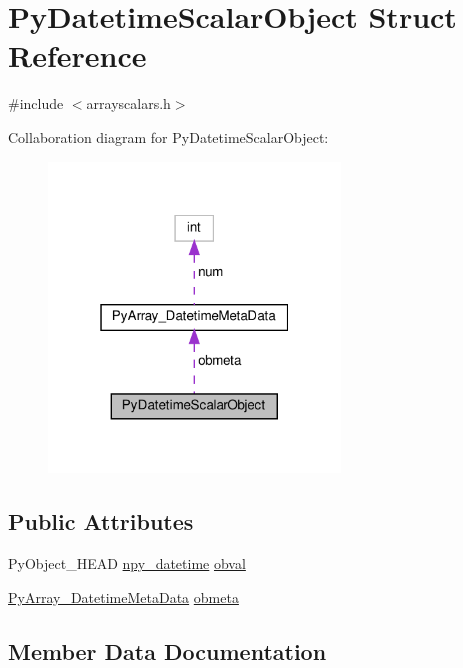 \hypertarget{structPyDatetimeScalarObject}{}\section{Py\+Datetime\+Scalar\+Object Struct Reference}
\label{structPyDatetimeScalarObject}


{\ttfamily \#include $<$arrayscalars.\+h$>$}



Collaboration diagram for Py\+Datetime\+Scalar\+Object\+:
\nopagebreak
\begin{figure}[H]
\begin{center}
\leavevmode
\includegraphics[width=220pt]{structPyDatetimeScalarObject__coll__graph}
\end{center}
\end{figure}
\subsection*{Public Attributes}
\begin{DoxyCompactItemize}
\item 
Py\+Object\+\_\+\+H\+E\+AD \hyperlink{npy__common_8h_a346c4c4fa39422a1cb2137423d407bbb}{npy\+\_\+datetime} \hyperlink{structPyDatetimeScalarObject_ab6f01dd90796ef8b7261ed646f7831cf}{obval}
\item 
\hyperlink{structPyArray__DatetimeMetaData}{Py\+Array\+\_\+\+Datetime\+Meta\+Data} \hyperlink{structPyDatetimeScalarObject_a3d73c2416837a6061328c8ecb3e2b4d3}{obmeta}
\end{DoxyCompactItemize}


\subsection{Member Data Documentation}
\mbox{\label{structPyDatetimeScalarObject_a3d73c2416837a6061328c8ecb3e2b4d3}} 
